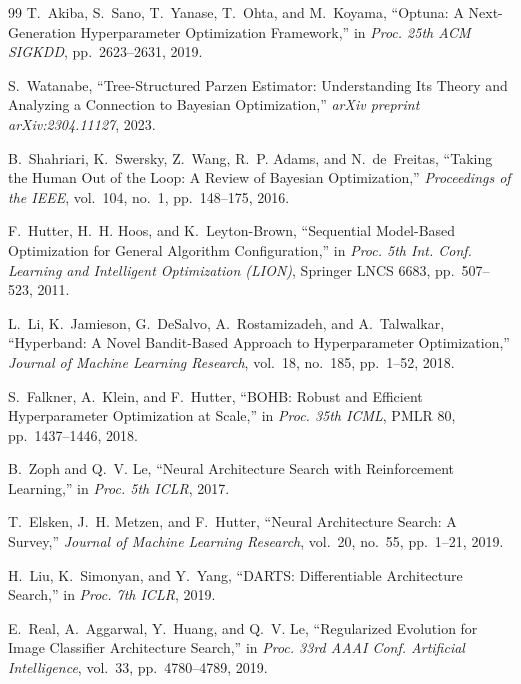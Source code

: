 \documentclass[12pt,a4paper]{article}
\begin{document}
\begin{thebibliography}{99}
T.~Akiba, S.~Sano, T.~Yanase, T.~Ohta, and M.~Koyama,
``Optuna: A Next-Generation Hyperparameter Optimization Framework,''
in \textit{Proc. 25th ACM SIGKDD}, pp.~2623--2631, 2019.

S.~Watanabe,
``Tree-Structured Parzen Estimator: Understanding Its Theory and Analyzing
a Connection to Bayesian Optimization,''
\textit{arXiv preprint arXiv:2304.11127}, 2023.


B.~Shahriari, K.~Swersky, Z.~Wang, R.~P. Adams, and N.~de~Freitas,
``Taking the Human Out of the Loop: A Review of Bayesian Optimization,''
\textit{Proceedings of the IEEE}, vol.~104, no.~1, pp.~148--175, 2016.

F.~Hutter, H.~H. Hoos, and K.~Leyton-Brown,
``Sequential Model-Based Optimization for General Algorithm Configuration,''
in \textit{Proc. 5th Int. Conf. Learning and Intelligent Optimization
(LION)}, Springer LNCS 6683, pp.~507--523, 2011.

L.~Li, K.~Jamieson, G.~DeSalvo, A.~Rostamizadeh, and A.~Talwalkar,
``Hyperband: A Novel Bandit-Based Approach to Hyperparameter Optimization,''
\textit{Journal of Machine Learning Research}, vol.~18, no.~185,
pp.~1--52, 2018.

S.~Falkner, A.~Klein, and F.~Hutter,
``BOHB: Robust and Efficient Hyperparameter Optimization at Scale,''
in \textit{Proc. 35th ICML}, PMLR 80, pp.~1437--1446, 2018.


B.~Zoph and Q.~V. Le,
``Neural Architecture Search with Reinforcement Learning,''
in \textit{Proc. 5th ICLR}, 2017.

T.~Elsken, J.~H. Metzen, and F.~Hutter,
``Neural Architecture Search: A Survey,''
\textit{Journal of Machine Learning Research}, vol.~20, no.~55,
pp.~1--21, 2019.

H.~Liu, K.~Simonyan, and Y.~Yang,
``DARTS: Differentiable Architecture Search,''
in \textit{Proc. 7th ICLR}, 2019.

E.~Real, A.~Aggarwal, Y.~Huang, and Q.~V. Le,
``Regularized Evolution for Image Classifier Architecture Search,''
in \textit{Proc. 33rd AAAI Conf. Artificial Intelligence}, vol.~33,
pp.~4780--4789, 2019.


\end{thebibliography}
\end{document}
